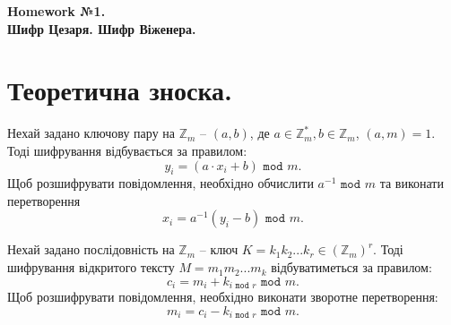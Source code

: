 \documentclass{../../test-template}
\begin{document}
\begin{center}
    \textbf{\Huge{Homework №1.} \\ \large Шифр Цезаря. Шифр Віженера.}
\end{center}

\section*{Теоретична зноска.}

\begin{tcolorbox}[breakable, colback=gray!10!white,fonttitle=\bfseries,colframe=blue!80!black,title=Афінний шифр]
Нехай задано ключову пару на $\mathbb{Z}_m$ -- $(a,b)$, де $a\in \mathbb{Z}^*_m,b\in \mathbb{Z}_m$, $(a,m)=1$. Тоді шифрування відбувається за правилом:
\begin{equation*}
    y_i=(a\cdot x_i +b)\texttt{ mod }m.
\end{equation*}
Щоб розшифрувати повідомлення, необхідно обчислити $a^{-1}\texttt{ mod } m$ та виконати перетворення
\begin{equation*}
    x_i=a^{-1}(y_i-b)\texttt{ mod }m.
\end{equation*}

\end{tcolorbox}

\begin{tcolorbox}[breakable, colback=gray!10!white,fonttitle=\bfseries,colframe=blue!80!black,title=Шифр Віженера]
Нехай задано послідовність на $\mathbb{Z}_m$ -- ключ $K=k_1k_2...k_r\in(\mathbb{Z}_m)^r$. Тоді шифрування відкритого тексту $M=m_1m_2...m_k$ відбуватиметься за правилом:
\begin{equation*}
    c_i=m_i+k_{i\texttt{ mod }r}\texttt{ mod }m.
\end{equation*}
Щоб розшифрувати повідомлення, необхідно виконати зворотне перетворення:
\vspace{-3mm}
\begin{equation*}
    m_i=c_i-k_{i\texttt{ mod }r}\texttt{ mod }m.
\end{equation*}

\end{tcolorbox}
\end{document}
